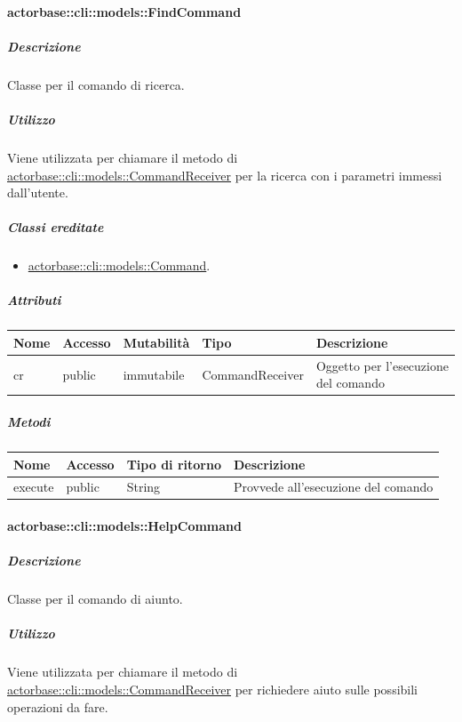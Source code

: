 \documentclass{scalatekids-article}
\begin{document}
\paragraph{actorbase::cli::models::FindCommand}
\label{sec:actorbase::cli::models::FindCommand}

\subparagraph{Descrizione}

Classe per il comando di ricerca.

\subparagraph{Utilizzo}

Viene utilizzata per chiamare il metodo di
\hyperref[sec:actorbase::cli::models::CommandReceiver]{actorbase::cli::models::CommandReceiver} per la ricerca con i parametri immessi
dall'utente.

\subparagraph{Classi ereditate}

\begin{itemize}
\item \hyperref[sec:actorbase::cli::models::Command]{actorbase::cli::models::Command}.
\end{itemize}

\subparagraph{Attributi}

\begin{tabular}{| p{1cm} | p{1.5cm} | p{2cm} | p{4cm} | p{8.5cm} |}
  \hline
  Nome & Accesso & Mutabilità & Tipo & Descrizione\\
  \hline
  cr & public & immutabile & CommandReceiver & Oggetto per l'esecuzione del comando \\
  \hline
\end{tabular}

\subparagraph{Metodi}

\begin{tabular}{| l | l | l | l |}
  \hline
  Nome & Accesso & Tipo di ritorno & Descrizione\\
  \hline
  execute & public & String & Provvede all'esecuzione del comando\\
  \hline
\end{tabular}


\paragraph{actorbase::cli::models::HelpCommand}
\label{sec:actorbase::cli::models::HelpCommand}

\subparagraph{Descrizione}

Classe per il comando di aiunto.

\subparagraph{Utilizzo}
Viene utilizzata per chiamare il metodo di
\hyperref[sec:actorbase::cli::models::CommandReceiver]{actorbase::cli::models::CommandReceiver} per richiedere aiuto sulle possibili operazioni da fare.
\end{document}
